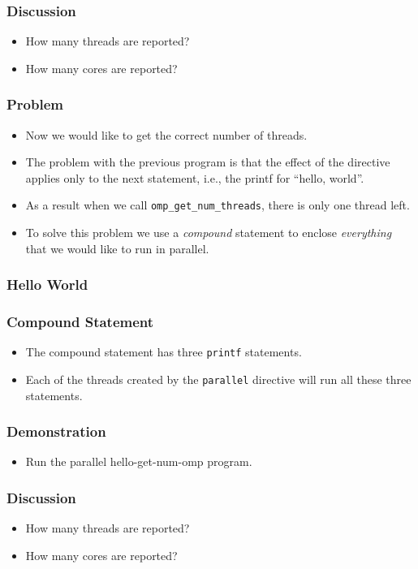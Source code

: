 \documentclass{beamer}
\begin{document}
\begin{frame}
\frametitle{Discussion}
\begin{itemize}
\item How many threads are reported?
\item How many cores are reported?
\end{itemize}
\end{frame}

\begin{frame}
\frametitle{Problem}
\begin{itemize}
\item Now we would like to get the correct number of threads.
\item The problem with the previous program is that the effect of the
  directive applies only to the next statement, i.e., the printf for
  ``hello, world''.
\item As a result when we call {\tt omp\_get\_num\_threads}, there is
  only one thread left.
\item To solve this problem we use a {\em compound} statement to
  enclose {\em everything} that we would like to run in parallel.
\end{itemize}
\end{frame}


\begin{frame}
\frametitle{Hello World}
\end{frame}

\begin{frame}
\frametitle{Compound Statement}
\begin{itemize}
\item The compound statement has three {\tt printf} statements.
\item Each of the threads created by the {\tt parallel} directive will
  run all these three statements.
\end{itemize}
\end{frame}

\begin{frame}
\frametitle{Demonstration}
\begin{itemize}
\item Run the parallel hello-get-num-omp program.
\end{itemize}
\end{frame}

\begin{frame}
\frametitle{Discussion}
\begin{itemize}
\item How many threads are reported?
\item How many cores are reported?
\end{itemize}
\end{frame}
\end{document}
